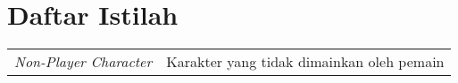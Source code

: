 \chapter*{Daftar Istilah}

\begingroup
\def\arraystretch{1.25}
\begin{tabular}{p{4cm}l}
	\textit{Non-Player Character} & Karakter yang tidak dimainkan oleh pemain \\
\end{tabular}
\endgroup
\clearpage

